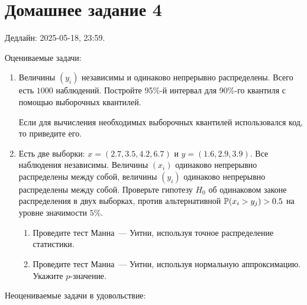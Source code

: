 
\section*{Домашнее задание 4}

Дедлайн: 2025-05-18, 23:59.

Оцениваемые задачи:

\begin{enumerate}
\item Величины $(y_i)$ независимы и одинаково непрерывно распределены. 
Всего есть $1000$ наблюдений. 
Постройте 95\%-й интервал для 90\%-го квантиля с помощью выборочных квантилей. 

Если для вычисления необходимых выборочных квантилей использовался код, то приведите его. 
     
\item Есть две выборки: $x = (2.7, 3.5, 4.2, 6.7)$ и $y = (1.6, 2.9, 3.9)$.
Все наблюдения независимы. 
Величины $(x_i)$ одинаково непрерывно распределены между собой, величины $(y_i)$ одинаково непрерывно распределены между собой. 
Проверьте гипотезу $H_0$ об одинаковом законе распределения в двух выборках, против альтернативной $\P(x_i > y_j) > 0.5$
на уровне значимости $5\%$.

\begin{enumerate}
    \item Проведите тест Манна~— Уитни, используя точное распределение статистики.
    \item Проведите тест Манна~— Уитни, используя нормальную аппроксимацию. Укажите $p$-значение.
\end{enumerate}

\end{enumerate}

Неоцениваемые задачи в удовольствие:

